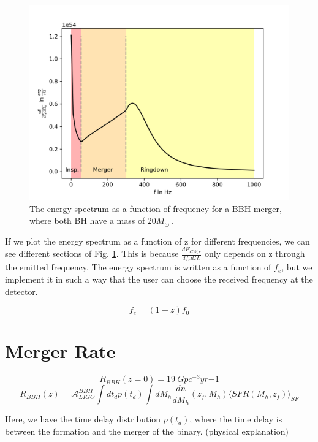 \begin{figure}[h]
    \centering
    \includegraphics[width=1\linewidth]{Images/dE_df_of_f.png}
    \caption{The energy spectrum as a function of frequency for a BBH merger, where both BH have a mass of 20$M_\odot\ $. }
    \label{dE_df_f}
\end{figure} 

If we plot the energy spectrum as a function of z for different frequencies, we can see different sections of Fig. \ref{dE_df_f}. This is because $\frac{dE_{GW,e}}{df_e d\Omega_e}$ only depends on z through the emitted frequency. The energy spectrum is written as a function of $f_e$, but we implement it in such a way that the user can choose the received frequency at the detector.

\begin{equation}
    f_e = (1+z)f_0
\end{equation}

\section{Merger Rate}
\begin{equation}
    R_{BBH}(z=0) = 19 \:Gpc^{-3}yr{-1}
\end{equation}
\begin{equation}
    R_{BBH}(z)=\mathcal{A}_{LIGO}^{BBH}\int dt_d p(t_d) \int dM_h \frac{dn}{dM_h}(z_f, M_h)\langle SFR(M_h, z_f)\rangle_{SF}
\end{equation}

Here, we have the time delay distribution $p(t_d)$, where the time delay is between the formation and the merger of the binary. (physical explanation)

